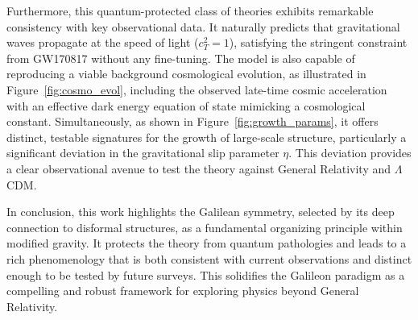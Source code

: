 \documentclass[twocolumn]{aastex631}
\begin{document}
Furthermore, this quantum-protected class of theories exhibits remarkable consistency with key observational data. It naturally predicts that gravitational waves propagate at the speed of light ($c_T^2=1$), satisfying the stringent constraint from GW170817 without any fine-tuning. The model is also capable of reproducing a viable background cosmological evolution, as illustrated in \mbox{Figure \ref{fig:cosmo_evol}}, including the observed late-time cosmic acceleration with an effective dark energy equation of state mimicking a cosmological constant. Simultaneously, as shown in \mbox{Figure \ref{fig:growth_params}}, it offers distinct, testable signatures for the growth of large-scale structure, particularly a significant deviation in the gravitational slip parameter $\eta$. This deviation provides a clear observational avenue to test the theory against General Relativity and $\Lambda$CDM.

In conclusion, this work highlights the Galilean symmetry, selected by its deep connection to disformal structures, as a fundamental organizing principle within modified gravity. It protects the theory from quantum pathologies and leads to a rich phenomenology that is both consistent with current observations and distinct enough to be tested by future surveys. This solidifies the Galileon paradigm as a compelling and robust framework for exploring physics beyond General Relativity.
\end{document}
